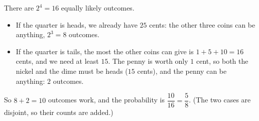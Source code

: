 There are $2^4=16$ equally likely outcomes.
\begin{itemize}
\item If the quarter is heads, we already have $25$ cents: the other three coins can be anything, $2^3=8$ outcomes.
\item If the quarter is tails, the most the other coins can give is $1+5+10=16$ cents, and we need at least $15$. The penny is worth only $1$ cent, so both the nickel and the dime must be heads ($15$ cents), and the penny can be anything: $2$ outcomes.
\end{itemize}
So $8+2=10$ outcomes work, and the probability is $\dfrac{10}{16}=\boxed{\dfrac{5}{8}}$. (The two cases are disjoint, so their counts are added.)
